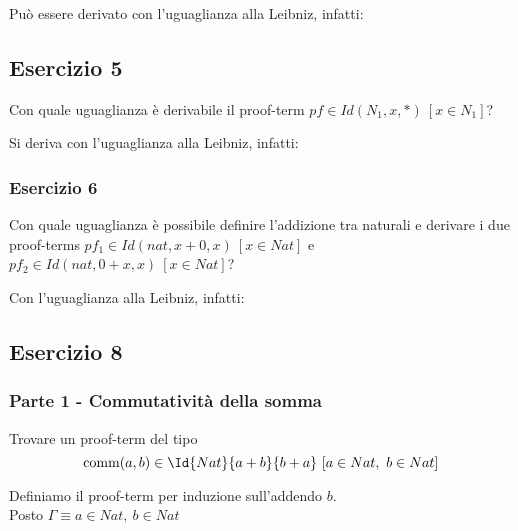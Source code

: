 Può essere derivato con l'uguaglianza alla Leibniz, infatti:



%

\subsection{Esercizio 5}
\begin{thm}
	Con quale uguaglianza è derivabile il proof-term $pf\in Id(N_1, x, \ast)~[x\in N_1]$?
\end{thm}
Si deriva con l'uguaglianza alla Leibniz, infatti:


\subsubsection{Esercizio 6}
\begin{thm}
	Con quale uguaglianza è possibile definire l'addizione tra naturali e derivare i due proof-terms $pf_1\in Id(nat, x+0,x)~[x\in Nat]$ e $pf_2\in Id(nat, 0+x,x)~[x\in Nat]$?
\end{thm}
Con l'uguaglianza alla Leibniz, infatti:


\subsection{Esercizio 8}
\subsubsection{Parte 1 - Commutatività della somma}
\begin{thm}
	Trovare un proof-term del tipo
	\[ \mathrm{comm}(a, b) \in \Id{Nat}{a+b}{b+a}\ [a\in Nat,\ b\in Nat] \]
\end{thm}
\proof
Definiamo il proof-term per induzione sull'addendo $b$.\\
Posto $\Gamma \equiv a\in Nat,\ b\in Nat$


